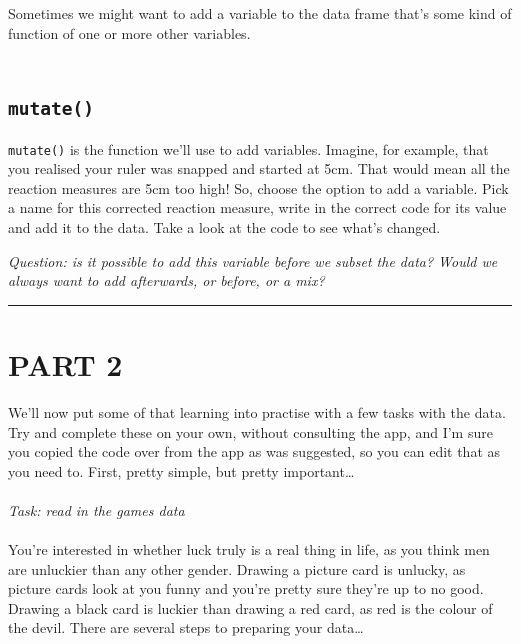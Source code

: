\documentclass[
]{book}
\begin{document}
Sometimes we might want to add a variable to the data frame that's some kind of
function of one or more other variables.\\
~\\

\hypertarget{mutate}{%
\subsection{\texorpdfstring{\texttt{mutate()}}{mutate()}}\label{mutate}}

\texttt{mutate()} is the function we'll use to add variables. Imagine, for example,
that you realised your ruler was snapped and started at 5cm. That would mean all
the reaction measures are 5cm too high! So, choose the option to add a variable.
Pick a name for this corrected reaction measure, write in the correct code for its
value and add it to the data. Take a look at the code to see what's changed.

\emph{Question: is it possible to add this variable before we subset the data? Would
we always want to add afterwards, or before, or a mix?}\\

\begin{center}\rule{0.5\linewidth}{\linethickness}\end{center}

\hypertarget{part-2}{%
\section{PART 2}\label{part-2}}

We'll now put some of that learning into practise with a few tasks with the
data. Try and complete these on your own, without consulting the app, and
I'm sure you copied the code over from the app as was suggested, so you can
edit that as you need to. First, pretty simple, but pretty important\ldots{}\\
~\\

\emph{Task: read in the games data}\\
~\\

You're interested in whether luck truly is a real thing in life, as you think
men are unluckier than any other gender. Drawing a picture card is unlucky, as
picture cards look at you funny and you're pretty sure they're up to no good.
Drawing a black card is luckier than drawing a red card, as red is the colour
of the devil. There are several steps to preparing your data\ldots{}
\end{document}
